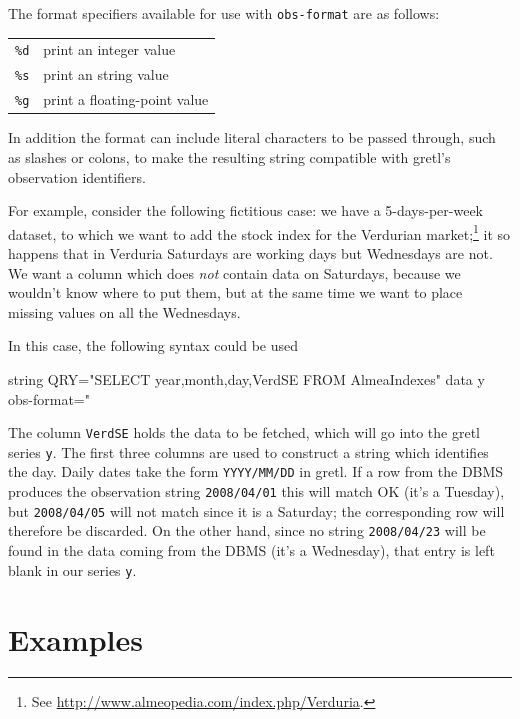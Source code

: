 The format specifiers available for use with \texttt{obs-format} are
as follows:

\begin{center}
\begin{tabular}{ll}
\texttt{\%d} & print an integer value \\
\texttt{\%s} & print an string value \\
\texttt{\%g} & print a floating-point value \\
\end{tabular}
\end{center}

In addition the format can include literal characters to be passed
through, such as slashes or colons, to make the resulting string
compatible with gretl's observation identifiers.

For example, consider the following fictitious case: we have a
5-days-per-week dataset, to which we want to add the stock index for
the Verdurian market;\footnote{See
  \url{http://www.almeopedia.com/index.php/Verduria}.} it so
happens that in Verduria Saturdays are working days but Wednesdays are
not. We want a column which does \emph{not} contain data on
Saturdays, because we wouldn't know where to put them, but at the same
time we want to place missing values on all the Wednesdays.

In this case, the following syntax could be used
%
\begin{code}
  string QRY="SELECT year,month,day,VerdSE FROM AlmeaIndexes"
  data y obs-format="%
\end{code}
%
The column \texttt{VerdSE} holds the data to be fetched, which will go
into the gretl series \texttt{y}. The first three columns are
used to construct a string which identifies the day. Daily dates take
the form \texttt{YYYY/MM/DD} in gretl.  If a row from the DBMS
produces the observation string \texttt{2008/04/01} this will match OK
(it's a Tuesday), but \texttt{2008/04/05} will not match since it is a
Saturday; the corresponding row will therefore be discarded.  On the
other hand, since no string \texttt{2008/04/23} will be found in the
data coming from the DBMS (it's a Wednesday), that entry is left blank
in our series \texttt{y}.

\section{Examples}
\label{sec:odbc-examples}

